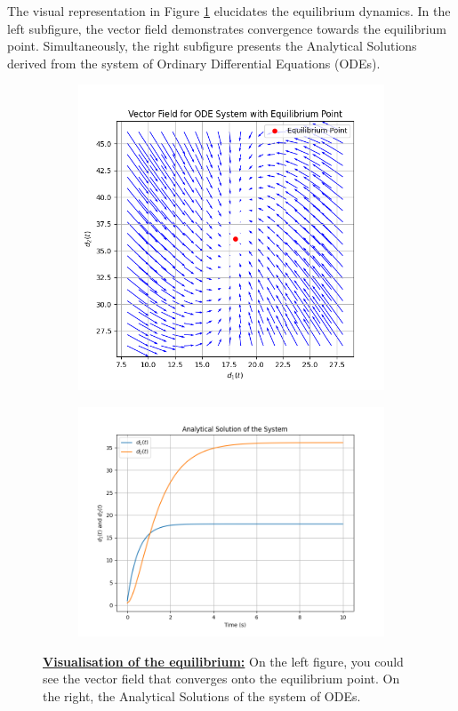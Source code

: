 \documentclass{article}
\begin{document}
		The visual representation in Figure \ref{fig:SE1} elucidates the equilibrium dynamics. In the left subfigure, the vector field demonstrates convergence towards the equilibrium point. Simultaneously, the right subfigure presents the Analytical Solutions derived from the system of Ordinary Differential Equations (ODEs).
		
		\begin{figure}[H]
			\centering
			\begin{subfigure}{0.45\textwidth}
				\centering
				\includegraphics[width=\linewidth]{FieldOfVector_CV2.png}
			\end{subfigure}
			\hfill
			\begin{subfigure}{0.45\textwidth}
				\centering
				\includegraphics[width=\linewidth]{AnalyticalSolution.png}
			\end{subfigure}
			\caption{\textbf{\underline{Visualisation of the equilibrium:}} On the left figure, you could see the vector field that converges onto the equilibrium point. On the right, the Analytical Solutions of the system of ODEs.}
			\label{fig:SE1}
		\end{figure}
		
\end{document}
